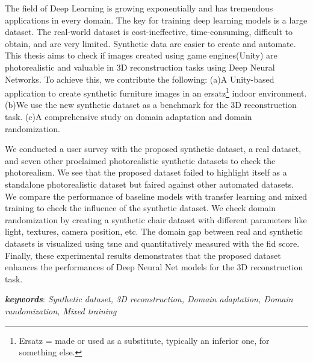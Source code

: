\documentclass[
]{thesis}
\begin{document}
The field of Deep Learning is growing exponentially and has tremendous applications in every domain.
The key for training deep learning models is a large dataset.
The real-world dataset is cost-ineffective, time-consuming, difficult to obtain, and are very limited.
Synthetic data are easier to create and automate.
This thesis aims to check if images created using game engines(Unity) are photorealistic and valuable in  3D reconstruction tasks using Deep Neural Networks.
To achieve this, we contribute the following:
(a)A Unity-based application to create synthetic furniture images in an ersatz\footnote{Ersatz = made or used as a substitute, typically an inferior one, for something else.} indoor environment.
(b)We use the new synthetic dataset as a benchmark for the 3D reconstruction task.
(c)A comprehensive study on domain adaptation and domain randomization.

We conducted a user survey with the proposed synthetic dataset, a real dataset, and seven other proclaimed photorealistic synthetic datasets to check the photorealism.
We see that the proposed dataset failed to highlight itself as a standalone photorealistic dataset but faired against other automated datasets.
We compare the performance of baseline models with transfer learning and mixed training to check the influence of the synthetic dataset.
We check domain randomization by creating a synthetic chair dataset with different parameters like light, textures, camera position, etc.
The domain gap between real and synthetic datasets is visualized using \gls{tsne} and quantitatively measured with the \gls{fid} score.
Finally, these experimental results demonstrates that the proposed dataset enhances the performances of Deep Neural Net models for the 3D reconstruction task.

\textbf{ \emph{keywords}}: \emph{Synthetic dataset, 3D reconstruction, Domain adaptation, Domain randomization, Mixed training}


\blankpage

\iftoggle{german}{\chapter*{Danksagungen}}{\chapter*{Acknowledgments}}
\end{document}
